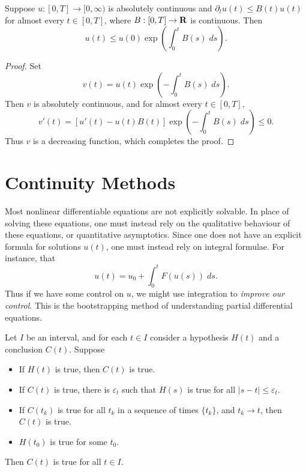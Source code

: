 \begin{theorem}
    Suppose $u: [0,T] \to [0,\infty)$ is absolutely continuous and $\partial_t u(t) \leq B(t) u(t)$ for almost every $t \in [0,T]$, where $B: [0,T] \to \operatorname{\mathbf{R}}$ is continuous. Then
    \[ u(t) \leq u(0) \exp \left( \int_0^t B(s)\; ds \right). \]
\end{theorem}
\begin{proof}
    Set
    \[ v(t) = u(t) \exp \left( - \int_0^t B(s)\; ds \right). \]
    Then $v$ is absolutely continuous, and for almost every $t \in [0,T]$,
    \[ v'(t) = [u'(t) - u(t)B(t)] \exp \left( - \int_0^t B(s)\; ds \right) \leq 0. \]
    Thus $v$ is a decreasing function, which completes the proof.
\end{proof}

\section{Continuity Methods}

Most nonlinear differentiable equations are not explicitly solvable. In place of solving these equations, one must instead rely on the qualitative behaviour of these equations, or quantitative asymptotics. Since one does not have an explicit formula for solutions $u(t)$, one must instead rely on integral formulae. For instance, that
%
\[ u(t) = u_0 + \int_0^t F(u(s))\; ds. \]
%
Thus if we have some control on $u$, we might use integration to \emph{improve our control}. This is the bootstrapping method of understanding partial differential equations.

\begin{theorem}[Bootstrapping]
    Let $I$ be an interval, and for each $t \in I$ consider a hypothesis $H(t)$ and a conclusion $C(t)$. Suppose
    \begin{itemize}
        \item If $H(t)$ is true, then $C(t)$ is true.
        \item If $C(t)$ is true, there is $\varepsilon_t$ such that $H(s)$ is true for all $|s - t| \leq \varepsilon_t$.
        \item If $C(t_k)$ is true for all $t_k$ in a sequence of times $\{ t_k \}$, and $t_k \to t$, then $C(t)$ is true.
        \item $H(t_0)$ is true for some $t_0$.
    \end{itemize}
    Then $C(t)$ is true for all $t \in I$.
\end{theorem}


